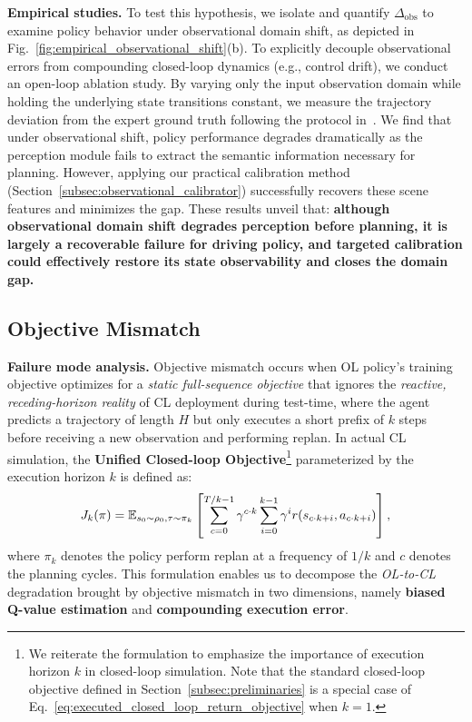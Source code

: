 \documentclass{article}
\begin{document}
\textbf{Empirical studies.} To test this hypothesis, we isolate and quantify $\Delta_{\mathrm{obs}}$ to examine policy behavior under observational domain shift, as depicted in Fig.~\ref{fig:empirical_observational_shift}(b). To explicitly decouple observational errors from compounding closed-loop dynamics (e.g., control drift), we conduct an open-loop ablation study. By varying only the input observation domain while holding the underlying state transitions constant, we measure the trajectory deviation from the expert ground truth following the protocol in~\cite{lin2025modelbased}. We find that under observational shift, policy performance degrades dramatically as the perception module fails to extract the semantic information necessary for planning. However, applying our practical calibration method (Section~\ref{subsec:observational_calibrator}) successfully recovers these scene features and minimizes the gap. These results unveil that: \textbf{although observational domain shift degrades perception before planning, it is largely a recoverable failure for driving policy, and targeted calibration could effectively restore its state observability and closes the domain gap.}

\subsection{Objective Mismatch}
\label{subsec:objective_mismatch}
\textbf{Failure mode analysis.} Objective mismatch occurs when OL policy's training objective optimizes for a \textit{static full-sequence objective} that ignores the \textit{reactive, receding-horizon reality} of CL deployment during test-time, where the agent predicts a trajectory of length $H$ but only executes a short prefix of $k$ steps before receiving a new observation and performing replan. In actual CL simulation, the \textbf{Unified Closed-loop Objective}\footnote{We reiterate the formulation to emphasize the importance of execution horizon $k$ in closed-loop simulation. Note that the standard closed-loop objective defined in Section~\ref{subsec:preliminaries} is a special case of Eq.~\ref{eq:executed_closed_loop_return_objective} when $k=1$.} parameterized by the execution horizon $k$ is defined as:
\begin{equation}
\small
\label{eq:executed_closed_loop_return_objective}
    J_k(\pi) = \mathbb{E}_{s_0 \sim \rho_0, \tau \sim \pi_k} \left[ \sum_{c=0}^{T/k - 1} \gamma^{c \cdot k} \sum_{i=0}^{k-1} \gamma^i r(s_{c \cdot k + i}, a_{c \cdot k + i}) \right],
\end{equation}
where $\pi_k$ denotes the policy perform replan at a frequency of $1/k$ and $c$ denotes the planning cycles. This formulation enables us to decompose the \textit{OL-to-CL} degradation brought by objective mismatch in two dimensions, namely \textbf{biased Q-value estimation} and  \textbf{compounding execution error}. 
\end{document}
